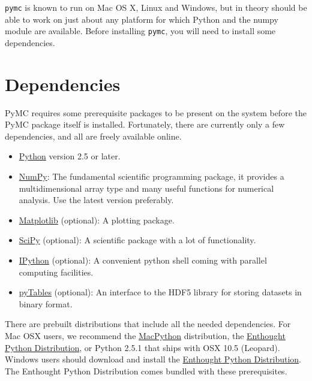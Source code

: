 


\texttt{pymc} is known to run on Mac OS X, Linux and Windows, but in theory should be 
able to work on just about any platform for which Python and the numpy module 
are  available. Before installing \texttt{pymc}, you will need to install some dependencies.



\hypertarget{dependencies}{}
\section*{Dependencies}

PyMC requires some prerequisite packages to be present on the system before the 
PyMC package itself is installed. Fortunately, there are currently only a few 
dependencies, and all are freely available online.
\begin{itemize}
\item {} 
\href{http://www.python.org/.}{Python} version 2.5 or later.

\item {} 
\href{http://www.scipy.org/NumPy}{NumPy}: The fundamental scientific programming package, it provides a 
multidimensional array type and many useful functions for numerical analysis. 
Use the latest version preferably.

\item {} 
\href{http://matplotlib.sourceforge.net/}{Matplotlib} (optional): A plotting package.

\item {} 
\href{http://www.scipy.org/}{SciPy} (optional): A scientific package with a lot of functionality.

\item {} 
\href{http://ipython.scipy.org/}{IPython} (optional): A convenient python shell coming with parallel 
computing facilities.

\item {} 
\href{http://www.pytables.org/moin}{pyTables} (optional): An interface to the HDF5 library for storing datasets
in binary format.

\end{itemize}

There are prebuilt distributions that include all the needed dependencies. For 
Mac OSX users, we recommend the \href{http://www.activestate.com/Products/ActivePython/}{MacPython} distribution, the 
\href{http://www.enthought.com/products/epddownload.php}{Enthought Python Distribution}, or Python 2.5.1 that ships with 
OSX 10.5 (Leopard). Windows users should download and install the 
\href{http://www.enthought.com/products/epddownload.php}{Enthought Python Distribution}. The Enthought Python Distribution comes 
bundled with these prerequisites.

